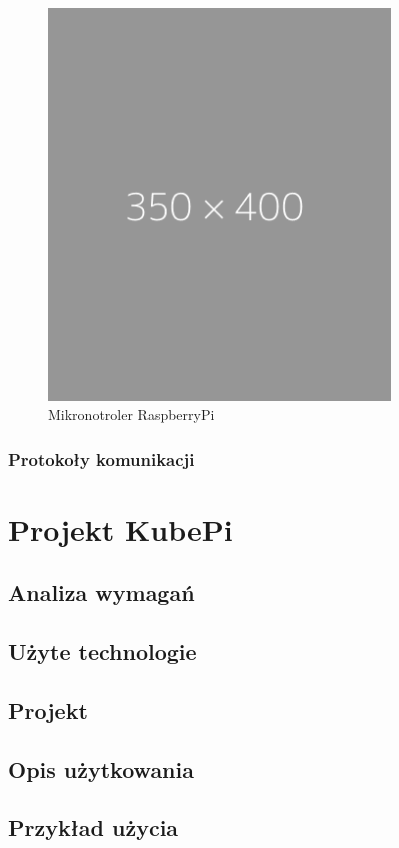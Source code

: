 \documentclass[12pt]{report}
\let\Oldsection\section
\renewcommand{\section}{\FloatBarrier\Oldsection}
\let\Oldsubsection\subsection
\renewcommand{\subsection}{\FloatBarrier\Oldsubsection}
\begin{document}
{\begin{figure}[h]
	\centering
	\includegraphics[width=0.81\textwidth]{images/placeholder.png}
	\caption{Mikronotroler RaspberryPi}
\end{figure}

\subsection{Protokoły komunikacji}

\chapter{Projekt KubePi} \label{project}
\section{Analiza wymagań}
\section{Użyte technologie}
\section{Projekt}
\section{Opis użytkowania}
\section{Przykład użycia}
}
\end{document}
